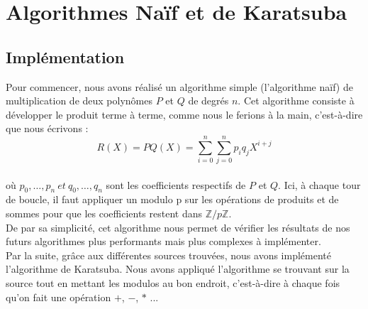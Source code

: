 \documentclass[12pt, a4paper]{article}
\begin{document}
\newpage

\section{Algorithmes Naïf et de Karatsuba}
\subsection{Implémentation}

Pour commencer, nous avons réalisé un algorithme simple (l'algorithme naïf) de multiplication de deux polynômes $P$ et $Q$ de degrés $n$. Cet algorithme consiste à développer le produit terme à terme, comme nous le ferions à la main, c'est-à-dire que nous écrivons : \\
\[R(X) = PQ(X) =
\displaystyle\sum_{i=0}^{n}\sum_{j=0}^{n} p_i q_j X^{i+j}\] \\
où $p_0,\dots,p_n\ et\ q_0,\dots,q_n$ sont les coefficients respectifs de $P$ et $Q$. Ici, à chaque tour de boucle, il faut appliquer un modulo p sur les opérations de produits et de sommes pour que les coefficients restent dans $\mathbb{Z}/p\mathbb{Z}$.\\
De par sa simplicité, cet algorithme nous permet de vérifier les résultats de nos futurs algorithmes plus performants mais plus complexes à implémenter.\\
\indent Par la suite, grâce aux différentes sources 
trouvées, nous avons implémenté l'algorithme de Karatsuba. Nous avons appliqué l'algorithme se trouvant sur la source \cite{Karatsuba} tout en mettant les modulos au bon endroit, c'est-à-dire à chaque fois qu'on fait une opération $+$, $-$, $*$ ...
\end{document}

